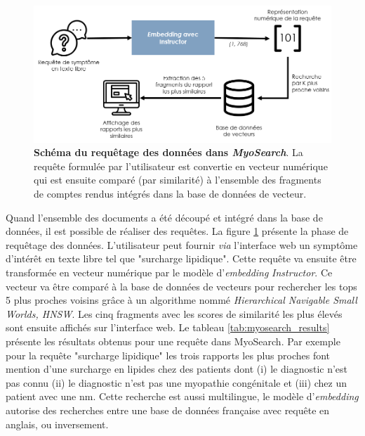 \begin{figure}[htbp]
 \centering
 \includegraphics[width=1\textwidth]{figures/myosearch_query.png}
 \caption[Requêtage des données dans \textit{MyoSearch}]{\textbf{Schéma du requêtage des données dans \textit{MyoSearch}}. La requête formulée par l'utilisateur est convertie en vecteur numérique qui est ensuite comparé (par similarité) à l'ensemble des fragments de comptes rendus intégrés dans la base de données de vecteur.}
 \label{fig:myosearch_query}
\end{figure}

Quand l'ensemble des documents a été découpé et intégré dans la base de données, il est possible de réaliser des requêtes. La figure \ref{fig:myosearch_query} présente la phase de requêtage des données. L'utilisateur peut fournir \textit{via} l'interface web un symptôme d'intérêt en texte libre tel que "surcharge lipidique". Cette requête va ensuite être transformée en vecteur numérique par le modèle d'\textit{embedding }\textit{Instructor}. Ce vecteur va être comparé à la base de données de vecteurs pour rechercher les tops 5 plus proches voisins grâce à un algorithme nommé \textit{Hierarchical Navigable Small Worlds, HNSW}. Les cinq fragments avec les scores de similarité les plus élevés sont ensuite affichés sur l'interface web. Le tableau \ref{tab:myosearch_results} présente les résultats obtenus pour une requête dans MyoSearch. Par exemple pour la requête "surcharge lipidique" les trois rapports les plus proches font mention d'une surcharge en lipides chez des patients dont (i) le diagnostic n'est pas connu (ii) le diagnostic n'est pas une myopathie congénitale et (iii) chez un patient avec une \gls{nm}. Cette recherche est aussi multilingue, le modèle d'\textit{embedding} autorise des recherches entre une base de données française avec requête en anglais, ou inversement.

